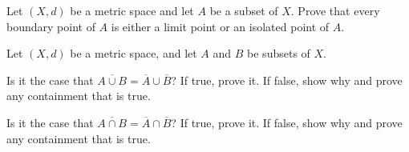 \item \label{ex:MS_boundary_limit_isolated} Let $(X,d)$ be a metric space and let $A$ be a subset of $X$. Prove that every boundary point of $A$ is either a limit point or an isolated point of $A$. 

\begin{comment}

\ExerciseSolution Let $A$ be a subset of a metric space $X$, and let $x \in X$ be a boundary point of $A$. We consider two cases: $x \notin A$ and $x \in A$. 
\begin{itemize}
\item Suppose $x \notin A$. Let $N$ be a neighborhood of $x$. Since $x$ is a boundary point of $A$ we know that $N$ contains a point in $X \setminus A$ and a point (necessarily different from $x$) in $A$. So $x$ is a limit point of $A$. 

\item Now suppose that $x \in A$. Since $x$ is a boundary point of $A$ we know that $N$ contains a point in $X \setminus A$ and a point in $A$ (which may just be $x$). If every neighborhood of $x$ contains a point in $A$ different from $x$, then $x$ is a limit point of $A$. Otherwise, there is a neighborhood $N$ of $x$ that contains no point in $A$ different from $x$. That is, $N \cap A = \{x\}$. In this case, $x$ is an isolated point of $A$. 

\end{itemize}

\end{comment}

\item Let $(X,d)$ be a metric space, and let $A$ and $B$ be subsets of $X$.
	\ba
	\item Is it the case that $\overline{A \cup B} = \overline{A} \cup \overline{B}$? If true, prove it. If false, show why  and prove any containment that is true. 
	
	\item Is it the case that $\overline{A \cap B} = \overline{A} \cap \overline{B}$? If true, prove it. If false, show why  and prove any containment that is true. 
	
	\ea

